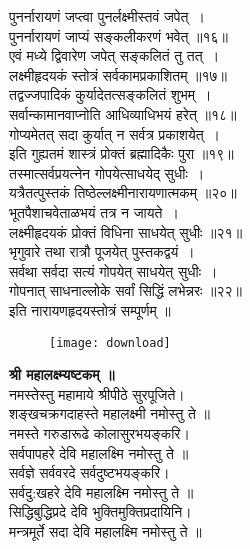 \documentclass[twoside,top=1.7cm, bottom=1.7cm, outer=1cm,landscape, inner=1.5cm,a5paper,]{book}
\begin{document}
\begin{center}
पुनर्नारायणं जप्त्वा पुनर्लक्ष्मीस्तवं जपेत्~।\\
पुनर्नारायणं जाप्यं सङ्कलीकरणं भवेत् ॥१६॥\\[10pt]
\newpage
एवं मध्ये द्विवारेण जपेत् सङ्कलितं तु तत्~।\\
लक्ष्मीहृदयकं स्तोत्रं सर्वकामप्रकाशितम् ॥१७॥\\[10pt]
तद्वज्जपादिकं कुर्यादेतत्सङ्कलितं शुभम्~।\\
सर्वान्कामानवाप्नोति आधिव्याधिभयं हरेत् ॥१८॥\\[10pt]
गोप्यमेतत् सदा कुर्यात् न सर्वत्र प्रकाशयेत्~।\\
इति गुह्यतमं शास्त्रं प्रोक्तं ब्रह्मादिकैः पुरा ॥१९॥\\[10pt]
तस्मात्सर्वप्रयत्नेन गोपयेत्साधयेद्  सुधीः~।\\
यत्रैतत्पुस्तकं तिष्ठेल्लक्ष्मीनारायणात्मकम् ॥२०॥\\[10pt]
\newpage
भूतपैशाचवेताळभयं तत्र न जायते~।\\
लक्ष्मीहृदयकं प्रोक्तं विधिना साधयेत् सुधीः ॥२१॥\\[10pt]
भृगुवारे तथा रात्रौ पूजयेत् पुस्तकद्वयं~।\\
सर्वथा सर्वदा सत्यं गोपयेत् साधयेत् सुधीः~।\\
गोपनात् साधनाल्लोके सर्वां सिद्धिं लभेन्नरः ॥२२॥\\[10pt]
इति नारायणहृदयस्तोत्रं सम्पूर्णम् ॥\\[10pt]
\begin{figure}[b]
\centering
\texttt{[image: download]}
\end{figure}
\newpage
\begin{center}

 {\bfseries श्री महालक्ष्म्यष्टकम् ॥}\\

नमस्तेस्तु महामाये श्रीपीठे सुरपूजिते।\\
शङ्खचक्रगदाहस्ते महालक्ष्मी नमोस्तु ते ॥\\[10pt]

नमस्ते गरुडारूढे कोलासुरभयङ्करि।\\
सर्वपापहरे देवि महालक्ष्मि नमोस्तु ते ॥\\[10pt]

सर्वज्ञे सर्ववरदे सर्वदुष्टभयङ्करि।\\
सर्वदु:खहरे देवि महालक्ष्मि नमोस्तु ते ॥\\[10pt]

सिद्धिबुद्धिप्रदे देवि भुक्तिमुक्तिप्रदायिनि।\\
मन्त्रमूर्ते सदा देवि महालक्ष्मि नमोस्तु ते ॥\\[10pt]


\end{center}
\end{center}
\end{document}
